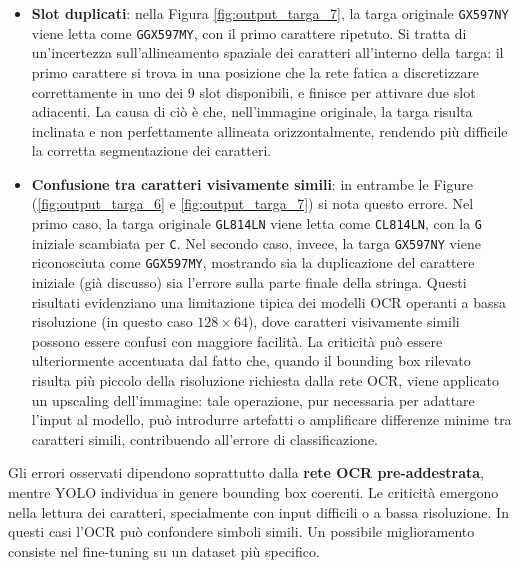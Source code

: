 \begin{itemize}
    \item \textbf{Slot duplicati}: nella Figura \ref{fig:output_targa_7}, la targa originale \texttt{GX597NY} viene letta come \texttt{GGX597MY}, con il primo carattere ripetuto. Si tratta di un'incertezza sull'allineamento spaziale dei caratteri all'interno della targa: il primo carattere si trova in una posizione che la rete fatica a discretizzare correttamente in uno dei 9 slot disponibili, e finisce per attivare due slot adiacenti. La causa di ciò è che, nell'immagine originale, la targa risulta inclinata e non perfettamente allineata orizzontalmente, rendendo più difficile la corretta segmentazione dei caratteri.
    \item \textbf{Confusione tra caratteri visivamente simili}: in entrambe le Figure (\ref{fig:output_targa_6} e \ref{fig:output_targa_7}) si nota questo errore. Nel primo caso, la targa originale \texttt{GL814LN} viene letta come \texttt{CL814LN}, con la \texttt{G} iniziale scambiata per \texttt{C}. Nel secondo caso, invece, la targa \texttt{GX597NY} viene riconosciuta come \texttt{GGX597MY}, mostrando sia la duplicazione del carattere iniziale (già discusso) sia l'errore sulla parte finale della stringa. Questi risultati evidenziano una limitazione tipica dei modelli OCR operanti a bassa risoluzione (in questo caso $128\times64$), dove caratteri visivamente simili possono essere confusi con maggiore facilità. La criticità può essere ulteriormente accentuata dal fatto che, quando il bounding box rilevato risulta più piccolo della risoluzione richiesta dalla rete OCR, viene applicato un upscaling dell'immagine: tale operazione, pur necessaria per adattare l'input al modello, può introdurre artefatti o amplificare differenze minime tra caratteri simili, contribuendo all'errore di classificazione.

\end{itemize}

Gli errori osservati dipendono soprattutto dalla \textbf{rete OCR pre-addestrata}, mentre YOLO individua in genere bounding box coerenti. Le criticità emergono nella lettura dei caratteri, specialmente con input difficili o a bassa risoluzione. In questi casi l'OCR può confondere simboli simili. Un possibile miglioramento consiste nel fine-tuning su un dataset più specifico.
